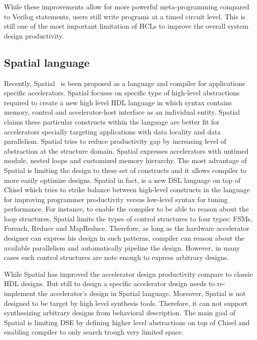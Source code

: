 While these improvements allow for more powerful meta-programming compared to Verilog  statements, users still write programs at a timed circuit level. This is still one of the most important limitation of HCLs to improve the overall system design productivity.

\subsection{Spatial language}
Recently, Spatial~\cite{david_PLDI_2018_spatial} is been proposed as a language and compiler for applications specific accelerators.
Spatial focuses on specific type of high-level abstractions required to create a new high level HDL language in which syntax contains memory, control and accelerator-host interface as an individual entity.
Spatial claims these particular constructs within the language are better fit for accelerators specially targeting applications with data locality and data parallelism.
Spatial tries to reduce productivity gap by increasing level of abstraction at the structure domain. Spatial expresses accelerators with untimed module, nested loops and customized memory hierarchy.
The most advantage of Spatial is limiting the design to these set of constructs and it allows compiler to more easily optimize designs.
Spatial in fact, is a new DSL language on top of Chisel which tries to strike balance between high-level constructs in the language for improving programmer productivity versus low-level syntax for tuning performance. 
For instance, to enable the compiler to be able to reason about the loop structures, Spatial limits the types of control structures to four types: FSMs, Foreach, Reduce and MapReduce. 
Therefore, as long as the hardware accelerator designer can express his design in such patterns, compiler can reason about the available parallelism and automatically pipeline the design.
However, in many cases such control structures are note enough to express arbitrary designs.

While Spatial has improved the accelerator design productivity compare to classic HDL designs.
But still to design a specific accelerator design needs to re-implement the accelerator's design in Spatial language. Moreover, Spatial is not designed to be target by high level synthesis tools.
Therefore, it can not support synthesizing arbitrary designs from behavioral description.
The main goal of Spatial is limiting DSE by defining higher level abstractions on top of Chisel and enabling compiler to only search trough very limited space.

